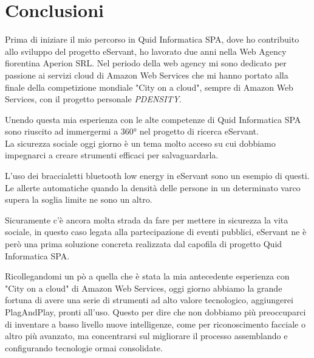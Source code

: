\chapter{Conclusioni}

Prima di iniziare il mio percorso in Quid Informatica SPA, dove ho contribuito allo
sviluppo del progetto eServant, ho lavorato due anni nella Web Agency fiorentina Aperion SRL.
Nel periodo della web agency mi sono dedicato per passione ai servizi cloud di Amazon
Web Services che mi hanno portato alla finale della competizione mondiale "City on a
cloud", sempre di Amazon Web Services, con il progetto personale \textit{PDENSITY}.

Unendo questa mia esperienza con le alte competenze di Quid Informatica SPA sono 
riuscito ad immergermi a 360° nel progetto di ricerca eServant.\\

La sicurezza sociale oggi giorno è un tema molto acceso su cui dobbiamo
impegnarci a creare strumenti efficaci per salvaguardarla.

L'uso dei braccialetti bluetooth low energy in eServant sono un esempio di questi.
Le allerte automatiche quando la densità delle persone in un determinato varco
supera la soglia limite ne sono un altro.

Sicuramente c'è ancora molta strada da fare per mettere in sicurezza la vita 
sociale, in questo caso legata alla partecipazione di eventi pubblici, eServant ne 
è però una prima soluzione concreta realizzata dal capofila di progetto Quid Informatica SPA.

Ricollegandomi un pò a quella che è stata la mia antecedente esperienza con "City on
a cloud" di Amazon Web Services, oggi giorno abbiamo la grande fortuna di avere
una serie di strumenti ad alto valore tecnologico, aggiungerei PlagAndPlay, pronti
all'uso.
Questo per dire che non dobbiamo più preoccuparci di inventare a basso livello 
nuove intelligenze, come per riconoscimento facciale o altro più avanzato, ma 
concentrarsi sul migliorare il processo assemblando e configurando tecnologie
ormai consolidate.
